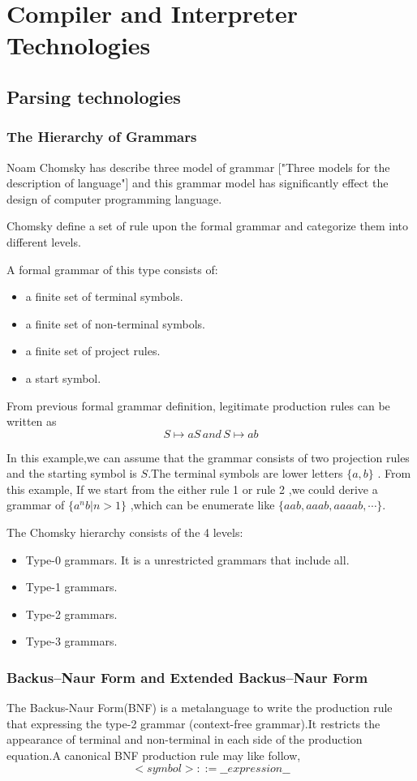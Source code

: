 \chapter{Compiler and Interpreter Technologies}
\section{Parsing technologies}

\subsection{The Hierarchy of Grammars}
Noam Chomsky has describe three model of grammar ["Three models for the description of language"]  and this grammar model has significantly effect the design of computer programming language.


Chomsky define a set of rule upon the formal grammar and categorize them into different levels.

A formal grammar of this type consists of:
\begin{itemize}
\item a finite set of terminal symbols.
\item a finite set of non-terminal symbols.
\item a finite set of project rules.
\item a start symbol.
\end{itemize} \cite{aho1986compilers}

From previous formal grammar definition, legitimate production rules can be written as 
 \[ S \mapsto aS  \,and \, S \mapsto ab \]
 
In this example,we can assume that the grammar consists of two projection rules and the starting symbol is $ S $.The terminal symbols are lower letters $ \{a ,b\} $ . From this example, If we start from the either rule 1 or rule 2 ,we could derive a  grammar of $ \{ a^n b | n>1  \}$ ,which can be enumerate like $ \{aab,aaab,aaaab,\cdots \} $.

The Chomsky hierarchy consists of the 4 levels:
\begin{itemize}
\item Type-0 grammars. It is a unrestricted grammars that include all.
\item Type-1 grammars.
\item Type-2 grammars.
\item Type-3 grammars.
\end{itemize}

\subsection {Backus–Naur Form and Extended Backus–Naur Form}
The Backus-Naur Form(BNF) is a metalanguage to write the production rule that expressing the type-2 grammar (context-free grammar).It  restricts the appearance of terminal and non-terminal in each side of the production equation.A canonical BNF production rule may like follow,
 \[   <symbol> ::= \_\_expression\_\_ \]
 
